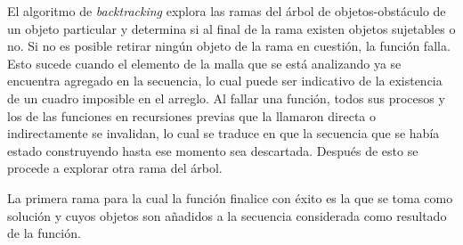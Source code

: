 El algoritmo de \textit{backtracking} explora las ramas del árbol de objetos-obstáculo de un objeto particular y determina si al final de la rama existen objetos sujetables o no.
Si no es posible retirar ningún objeto de la rama en cuestión, la función falla.
Esto sucede cuando el elemento de la malla que se está analizando ya se encuentra agregado en la secuencia, lo cual puede ser indicativo de la existencia de un cuadro imposible en el arreglo.
Al fallar una función, todos sus procesos y los de las funciones en recursiones previas que la llamaron directa o indirectamente se invalidan, lo cual se traduce en que la secuencia que se había estado construyendo hasta ese momento sea descartada.
Después de esto se procede a explorar otra rama del árbol. 

La primera rama para la cual la función finalice con éxito es la que se toma como solución y cuyos objetos son añadidos a la secuencia considerada como resultado de la función.
%

